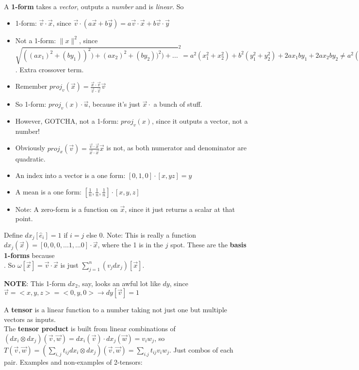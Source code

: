 \documentclass[11pt, oneside]{article}   	%
\begin{document}
A \textbf{1-form} takes a \emph{vector}, outputs a \emph{number} and is \emph{linear}.  So 
\begin{itemize}
\item 1-form: $\vec{v} \cdot \vec{x}$, since $\vec{v} \cdot (a\vec{x} + b\vec{y}) = a\vec{v} \cdot \vec{x} + b\vec{v} \cdot \vec{y}$
\item Not a 1-form: $\|x\|^2$, since $\sqrt{((ax_1)^2 + (by_1))^2) + (ax_2)^2 + (by_2))^2) + ... }^2
 = a^2(x_1^2 + x_2^2) + b^2(y_1^2 + y_2^2) + 2ax_1by_1 + 2ax_2by_2 \neq a^2(x_1^2 + x_2^2) + b^2(y_1^2 + y_2^2) 
 = \sqrt{ax_1^2 + ax_2^2}^2 + \sqrt{by_1^2 + by_2^2}^2$. Extra crossover term.
\item Remember $proj_v(\vec{x}) = \frac{\vec{x} \cdot \vec{v}}{\vec{v} \cdot \vec{v}}\vec{v}$
\item So 1-form: $proj_v(x) \cdot \vec{u}$, because it's just $\vec{x} \cdot$ a bunch of stuff.
\item However, GOTCHA, not a 1-form: $proj_v(x)$, since it outputs a vector, not a number!
\item Obviously $proj_x(\vec{v}) = \frac{\vec{v} \cdot \vec{x}}{\vec{x} \cdot \vec{x}}\vec{x}$ is not, as both numerator and denominator are quadratic.
\item An index into a vector is a one form: $[0, 1, 0] \cdot [x,y z ] =y$
\item A mean is a one form: $[\frac{1}{n}, \frac{1}{n}, \frac{1}{n}] \cdot  [x,y,z ]$
\item Note: A zero-form is a function on $\vec{x}$, since it just returns a scalar at that point.
\end{itemize}

Define $dx_j[\hat{e}_i] = 1$ if $i=j$ else $0$.  Note: This is really a function $dx_j(\vec{x}) = [0, 0, 0, ... 1, ... 0] \cdot \vec{x}$, where the 1 is in the $j$ spot. These are the \textbf{basis 1-forms} because 
\\
.  
So $\omega[\vec{x}] = \vec{v} \cdot \vec {x}$ is just $\sum_{j=1}^n (v_jdx_j)[\vec{x}].$

\textbf{NOTE}: This 1-form $dx_2$, say, looks an awful lot like $dy$, since $\vec{v} = <x, y, z> = <0, y, 0> \rightarrow dy[\vec{v}] = 1$

A \textbf{tensor} is a linear function to a number taking not just one but multiple vectors as inputs.  
\\ 
The \textbf{tensor product} is built from linear combinations of $(dx_i \otimes dx_j)(\vec{v},\vec{w}) = dx_i(\vec{v}) \cdot dx_j(\vec{w}) = v_iw_j$, so $T(\vec{v}, \vec{w}) = (\sum_{i,j} t_{ij}dx_i \otimes dx_j)(\vec{v}, \vec{w}) = \sum_{i.j}t_{ij}v_iw_j$.  Just combos of each pair.  Examples and non-examples of 2-tensors:
\end{document}
